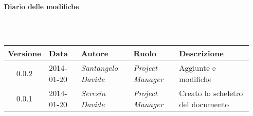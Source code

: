 \noindent\begin{Large}\textbf{Diario delle modifiche}\end{Large}\\
\\
\begin{small}
\begin{tabular}{|c|p{1.8cm}|p{2.8cm}|p{2.8cm}|p{3.5cm}|}
\hline
Versione & Data & Autore & Ruolo & Descrizione \\
\hline
\hline
0.0.2 & 2014-01-20 & 
\textit{Santangelo Davide} &
\textit{Project Manager} &  Aggiunte e modifiche\\
\hline
\hline
0.0.1 & 2014-01-20 & 
\textit{Seresin Davide} &
\textit{Project Manager} &  Creato lo scheletro del documento\\
\hline
\end{tabular}\\
\end{small}